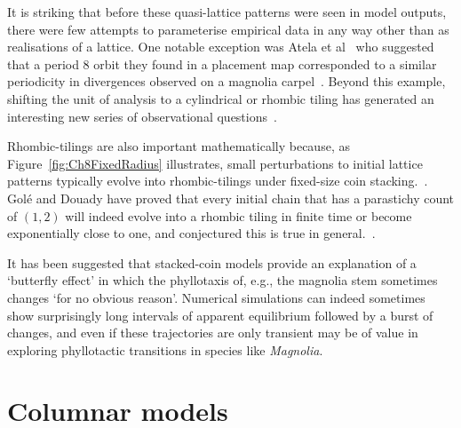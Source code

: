  It is striking that before these quasi-lattice patterns were seen in model outputs, there were few attempts to parameterise empirical data in any way other than as realisations of a lattice. One notable exception was Atela et al~\cite{atelaDynamicalSystemPlant2002} who suggested that a period 8 orbit they found in a placement map corresponded to a similar periodicity in divergences observed on a magnolia carpel~\cite{tuckerPhyllotaxisVascularOrganization1961}. 
 Beyond this example, shifting the unit of analysis to a cylindrical or rhombic tiling has generated an interesting new series of observational questions~\autocite{douadyFibonacciQuasisymmetricPhyllotaxis2016}.
 

 Rhombic-tilings are also important mathematically because, as Figure~\ref{fig:Ch8FixedRadius} illustrates, small perturbations to initial lattice patterns typically evolve into rhombic-tilings under fixed-size coin stacking.~\autocite{atelaRhombicTilingsPrimordia2017}.
   Golé and Douady have proved that every initial chain that has a parastichy count of $(1,2)$ will indeed evolve into a rhombic tiling in finite time or become exponentially close to one, and conjectured 
   this is true in general.~\autocite{goleConvergenceDiskStacking2020}.
 
  It has been suggested that stacked-coin models provide an explanation of a `butterfly effect' in which the phyllotaxis of, e.g., the magnolia stem sometimes changes `for no obvious reason'\autocite{zagorska-marekSignificanceGandLdislocations2016}. Numerical simulations can indeed sometimes show surprisingly long intervals of apparent equilibrium followed by a burst of changes, and even if these trajectories
  are only transient may be of value in exploring phyllotactic transitions in species like \textit{Magnolia}.
     
\section{Columnar models}
\label{sec:columns}

